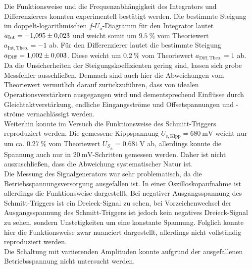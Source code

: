 Die Funktionsweise und die Frequenzabhängigkeit des Integrators und Differenzierers konnten experimentell bestätigt werden. Die bestimmte Steigung im doppelt-logarithmischen $f$-$U_\mathrm{a}$-Diagramm für den Integrator lautet $a_\mathrm{Int} = \num{-1.095 \pm 0.023}$ und weicht somit um $\SI{9.5}{\percent}$ vom Theoriewert $a_\mathrm{Int,Theo.} = \num{-1}$ ab.
Für den Differenzierer lautet die bestimmte Steigung $a_\mathrm{Diff} = \num{1.002 \pm 0.003}$. Diese weicht um $\SI{0.2}{\percent}$ vom Theoriewert $a_\mathrm{Diff,Theo.} = \num{1}$ ab.
Da die Unsicherheiten der Steigungskoeffizienten gering sind, lassen sich grobe Messfehler ausschließen. Demnach sind auch hier die Abweichungen vom Theoriewert vermutlich darauf zurückzuführen, dass von idealen Operationsverstärkern ausgegangen wird und dementsprechend Einflüsse  durch Gleichtaktverstärkung, endliche Eingangsströme und Offsetspannungen und -ströme vernachlässigt werden.
\\

Weiterhin konnte im Versuch die Funktionsweise des Schmitt-Triggers reproduziert werden. Die gemessene Kippspannung $U_{\mathrm{e, Kipp}} = \SI{680}{\milli\volt}$ weicht nur um ca. $\SI{0.27}{\percent}$ vom Theoriewert $U_{S_{\pm}} = 0.6\bar{81} \, \si{\volt}$ ab, allerdings konnte die Spannung auch nur in $\SI{20}{\milli\volt}$-Schritten gemessen werden. Daher ist nicht auszuschließen, dass die Abweichung systematischer Natur ist.\\

Die Messung des Signalgenerators war sehr problematisch, da die Betriebsspannungsversorgung ausgefallen ist. In einer Oszilloskopaufnahme\cite{ahlmann_2021} ist allerdings die Funktionsweise dargestellt. Bei negativer Ausgangsspannung des Schmitt-Triggers ist ein Dreieck-Signal zu sehen, bei Vorzeichenwechsel der Ausgangsspannung des Schmitt-Triggers ist jedoch kein negatives Dreieck-Signal zu sehen, sondern Unstetigkeiten um eine konstante Spannung. Folglich konnte hier die Funktionsweise zwar nuanciert dargestellt, allerdings nicht vollständig reproduziert werden.\\

Die Schaltung mit variierenden Amplituden konnte aufgrund der ausgefallenen Betriebsspannung nicht untersucht werden.
